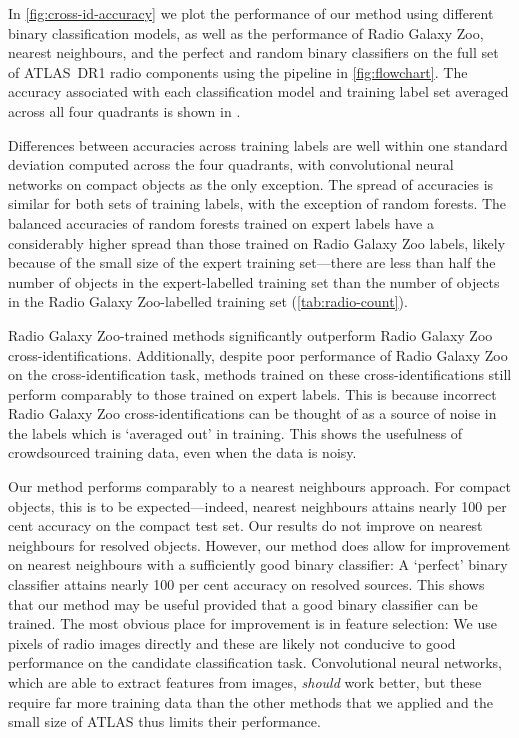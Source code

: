     In \autoref{fig:cross-id-accuracy} we plot the performance {of our
    method using different binary classification models}, as well as the
    performance of Radio Galaxy Zoo, nearest neighbours, and the perfect and
    random binary classifiers on the full set of ATLAS~DR1 radio components
    using the pipeline in \autoref{fig:flowchart}. The accuracy
    {associated with each classification model} and training label set
    averaged across all four quadrants is shown in .

    Differences between accuracies across training labels are well within one
    standard deviation computed across the four quadrants, with convolutional
    neural networks on compact objects as the only exception. The spread of
    accuracies is similar for both sets of training labels, with the exception
    of random forests. The balanced accuracies of random forests trained on
    expert labels have a considerably higher spread than those trained on
    Radio Galaxy Zoo labels, likely because of the small size of the expert
    training set---there are less than half the number of objects in the
    expert-labelled training set than the number of objects in the Radio
    Galaxy Zoo-labelled training set (\autoref{tab:radio-count}).

    Radio Galaxy Zoo-trained methods significantly outperform Radio Galaxy Zoo
    cross-identifications. Additionally, despite poor performance of Radio
    Galaxy Zoo on the cross-identification task, methods trained on these
    cross-identifications still perform comparably to those trained on expert
    labels. This is because incorrect Radio Galaxy Zoo cross-identifications
    can be thought of as a source of noise in the labels which is `averaged out'
    in training. This shows the usefulness of crowdsourced training data, even
    when the data is noisy.

    Our method performs comparably to a nearest neighbours approach. For
    compact objects, this is to be expected---indeed, nearest neighbours
    attains nearly 100 per cent accuracy on the compact test set. Our results
    do not improve on nearest neighbours for resolved objects. However, our
    method does allow for improvement on nearest neighbours with a
    sufficiently good binary classifier: A `perfect' binary classifier attains
    nearly 100 per cent accuracy on resolved sources. This shows that our
    method may be useful provided that a good binary classifier can be
    trained. The most obvious place for improvement is in feature selection:
    We use pixels of radio images directly and these are likely not conducive
    to good performance on the candidate classification task. Convolutional
    neural networks, which are able to extract features from images,
    \emph{should} work better, but these require far more training data than
    the other methods that we applied and the small size of ATLAS thus limits their performance.


